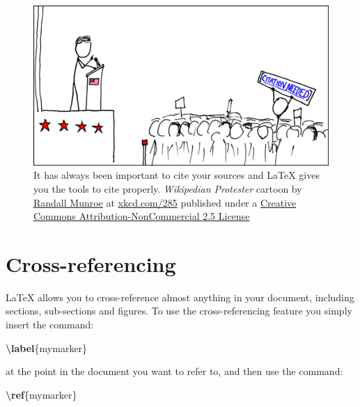 \documentclass[
]{book}
\newenvironment{Shaded}{\begin{snugshade}}{\end{snugshade}}
\newcommand{\ExtensionTok}[1]{#1}
\newcommand{\KeywordTok}[1]{\textcolor[rgb]{0.13,0.29,0.53}{\textbf{#1}}}
\newcommand{\NormalTok}[1]{#1}
\begin{document}
\begin{figure}

{\centering \includegraphics[width=0.7\linewidth]{images/wikipedian_protester} 

}

\caption{It has always been important to cite your sources and LaTeX gives you the tools to cite properly. \emph{Wikipedian Protester} cartoon by \href{https://en.wikipedia.org/wiki/Randall_Munroe}{Randall Munroe} at \href{https://xkcd.com/285/}{xkcd.com/285} published under a \href{https://creativecommons.org/licenses/by-nc/2.5/}{Creative Commons Attribution-NonCommercial 2.5 License}}\label{fig:wikipedian-fig}
\end{figure}



\hypertarget{cross-referencing}{%
\section{Cross-referencing}\label{cross-referencing}}

LaTeX allows you to cross-reference almost anything in your document, including sections, sub-sections and figures. To use the cross-referencing feature you simply insert the command:

\begin{Shaded}
\begin{Highlighting}[]
\KeywordTok{\textbackslash{}label}\NormalTok{\{}\ExtensionTok{mymarker}\NormalTok{\}}
\end{Highlighting}
\end{Shaded}

at the point in the document you want to refer to, and then use the command:

\begin{Shaded}
\begin{Highlighting}[]
\KeywordTok{\textbackslash{}ref}\NormalTok{\{}\ExtensionTok{mymarker}\NormalTok{\}}
\end{Highlighting}
\end{Shaded}
\end{document}
